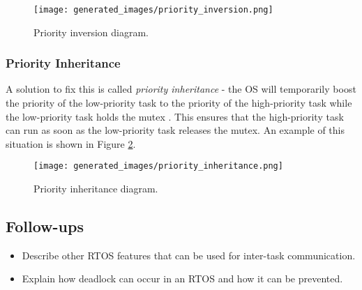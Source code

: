 \documentclass[main.tex]{subfiles}
\begin{document}
\begin{figure}[H]
    \centering
    \texttt{[image: generated\_images/priority\_inversion.png]}
    \caption{Priority inversion diagram.}
    \label{fig:priority_inversion}
\end{figure}

\subsubsection{Priority Inheritance}
A solution to fix this is called \textit{priority inheritance} - the OS will temporarily boost the priority of the low-priority task to the priority of the high-priority task while the low-priority task holds the mutex \cite{digikey_priority_inversion}. This ensures that the high-priority task can run as soon as the low-priority task releases the mutex. An example of this situation is shown in Figure \ref{fig:priority_inheritance}.

\begin{figure}[H]
    \centering
    \texttt{[image: generated\_images/priority\_inheritance.png]}
    \caption{Priority inheritance diagram.}
    \label{fig:priority_inheritance}
\end{figure}

\subsection{Follow-ups}
\begin{itemize}
    \item Describe other RTOS features that can be used for inter-task communication.
    \item Explain how deadlock can occur in an RTOS and how it can be prevented.
\end{itemize}
\end{document}
